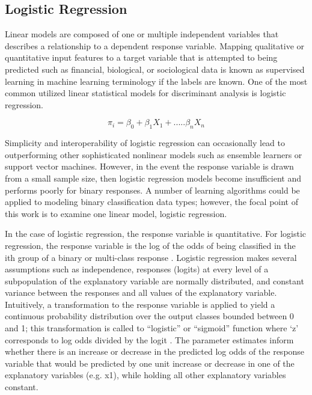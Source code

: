 \documentclass{llncs}
\begin{document}
\subsection{Logistic Regression}
Linear models are composed of one or multiple independent variables that describes a relationship to a dependent response variable. Mapping qualitative or quantitative input features to a target variable that is attempted to being predicted such as financial, biological, or sociological data is known as supervised learning in machine learning terminology if the labels are known.  One of the most common utilized linear statistical models for discriminant analysis is logistic regression.

\begin{equation}
\pi_{i} = \beta_{0} + \beta_{1}X_{1} + .....\beta_{n}X_{n}
\end{equation}

Simplicity and interoperability of logistic regression can occasionally lead to outperforming other sophisticated nonlinear models such as ensemble learners or support vector machines. However, in the event the response variable is drawn from a small sample size, then logistic regression models become insufficient and performs poorly for binary responses\cite{motrenko}. A number of learning algorithms could be applied to modeling binary classification data types; however, the focal point of this work is to examine one linear model, logistic regression. 

In the case of logistic regression, the response variable is quantitative. For logistic regression, the response variable is the log of the odds of being classified in the ith group of a binary or multi-class response \cite{hastie}. Logistic regression makes several assumptions such as independence, responses (logits) at every level of a subpopulation of the explanatory variable are normally distributed, and constant variance between the responses and all values of the explanatory variable. Intuitively, a transformation to the response variable is applied to yield a continuous probability distribution over the output classes bounded between 0 and 1; this transformation is called to “logistic” or “sigmoid” function where ‘z’ corresponds to log odds divided by the logit \cite{ng}. The parameter estimates inform whether there is an increase or decrease in the predicted log odds of the response variable that would be predicted by one unit increase or decrease in one of the explanatory variables (e.g. x1), while holding all other explanatory variables constant.
\end{document}
